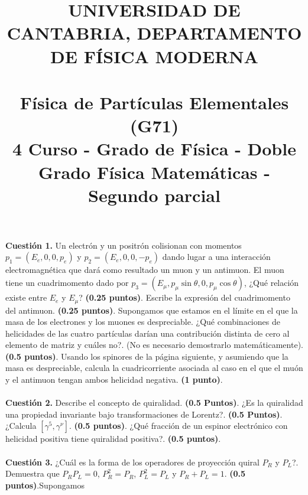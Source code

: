 \documentclass[paper=a4, fontsize=11pt]{scrartcl} %
\date{}
\title{	
\normalfont \normalsize 
\textsc{UNIVERSIDAD DE CANTABRIA, DEPARTAMENTO DE FÍSICA MODERNA} \\ [20pt] %
\horrule{0.5pt} \\[0.4cm] %
\huge Física de Partículas Elementales (G71) \\ %
\normalsize 4 Curso - Grado de Física - Doble Grado Física Matemáticas - Segundo parcial
\horrule{2pt} \\[0.5cm] %
}
\numberwithin{equation}{section} %
\numberwithin{figure}{section} %
\numberwithin{table}{section} %
\begin{document}
\maketitle %

\vspace{-2.5cm}

\textbf{Cuestión 1.} Un electrón y un positrón colisionan con momentos $p_1=(E_e, 0, 0, p_e)$ y $p_2=(E_e, 0, 0, -p_e)$ dando lugar a una interacción
electromagnética que dará como resultado un muon y un antimuon. El muon tiene un cuadrimomento dado por $p_3=(E_\mu, p_\mu\sin{\theta}, 0, p_\mu\cos{\theta})$,
¿Qué relación existe entre $E_e$ y $E_\mu$? \textbf{(0.25 puntos)}. Escribe la expresión del cuadrimomento del antimuon. \textbf{(0.25 puntos)}. Supongamos 
que estamos en el límite en el que la masa de los electrones y los muones es despreciable. ¿Qué combinaciones de helicidades de las cuatro partículas darían
una contribución distinta de cero al elemento de matriz y cuáles no?. (No es necesario demostrarlo matemáticamente).\textbf{(0.5 puntos)}. Usando los spinores
de la página siguiente, y asumiendo que la masa es despreciable, calcula la cuadricorriente asociada al caso en el que el muón y el antimuon tengan ambos helicidad negativa. \textbf{(1 punto)}.
\\
\\
\textbf{Cuestión 2.} Describe el concepto de quiralidad. \textbf{(0.5 Puntos)}. ¿Es la quiralidad una propiedad invariante bajo transformaciones de Lorentz?. \textbf{(0.5 Puntos)}.
¿Calcula $[\gamma^5, \gamma^\nu]$. \textbf{(0.5 puntos)}. ¿Qué fracción de un espinor electrónico con helicidad positiva tiene quiralidad positiva?. \textbf{(0.5 puntos)}.
\\
\\
\textbf{Cuestión 3.} ¿Cuál es la forma de los operadores de proyección quiral $P_R$ y $P_L$?. Demuestra que $P_RP_L=0$, $P_R^2=P_R$, $P_L^2=P_L$ y $P_R + P_L =1$. \textbf{(0.5 puntos)}.Supongamos
\end{document}
